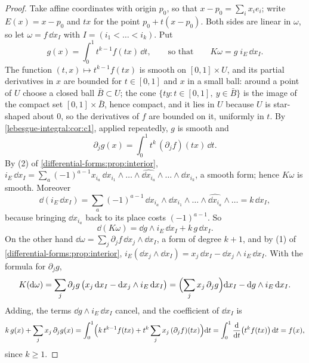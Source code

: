 \begin{notechapter}
\begin{proof}
Take affine coordinates with origin $p_0$, so that
$x - p_0 = \sum_ix_ie_i$; write $E(x) = x - p_0$ and $tx$ for the point
$p_0 + t(x - p_0)$. Both sides are linear in $\omega$, so let
$\omega = f\,\dd x_I$ with $I = (i_1 < \dots < i_k)$. Put
\[
  g(x) = \int_0^1t^{k-1}f(tx)\,\dd t ,
  \qquad\text{so that}\qquad
  K\omega = g\;i_E\,\dd x_I .
\]
The function $(t, x)\mapsto t^{k-1}f(tx)$ is smooth on $[0, 1]\times U$,
and its partial derivatives in $x$ are bounded for $t\in[0, 1]$ and $x$
in a small ball: around a point of $U$ choose a closed ball
$\bar B\subset U$; the cone $\{ty : t\in[0, 1],\ y\in\bar B\}$ is the
image of the compact set $[0, 1]\times\bar B$, hence compact, and it
lies in $U$ because $U$ is star-shaped about $0$, so the derivatives
of $f$ are bounded on it, uniformly in $t$.
By \cref{lebesgue-integral:cor:c1}, applied
repeatedly, $g$ is smooth and
\[
  \partial_jg(x) = \int_0^1t^k\,(\partial_jf)(tx)\,\dd t .
\]
By (2) of \cref{differential-forms:prop:interior},
$i_E\,\dd x_I = \sum_a(-1)^{a-1}x_{i_a}\,
\dd x_{i_1}\wedge\dots\wedge\widehat{\dd x_{i_a}}\wedge\dots\wedge
\dd x_{i_k}$, a smooth form; hence $K\omega$ is smooth. Moreover
\[
  \dd(i_E\,\dd x_I)
  = \sum_a(-1)^{a-1}\,\dd x_{i_a}\wedge
    \dd x_{i_1}\wedge\dots\wedge\widehat{\dd x_{i_a}}\wedge\dots
  = k\,\dd x_I ,
\]
because bringing $\dd x_{i_a}$ back to its place costs $(-1)^{a-1}$.
So
\[
  \dd(K\omega) = \dd g\wedge i_E\,\dd x_I + k\,g\,\dd x_I .
\]
On the other hand $\dd\omega = \sum_j\partial_jf\,\dd x_j\wedge\dd x_I$,
a form of degree $k + 1$, and by (1) of
\cref{differential-forms:prop:interior},
$i_E(\dd x_j\wedge\dd x_I) = x_j\,\dd x_I - \dd x_j\wedge i_E\,\dd x_I$.
With the formula for $\partial_jg$,
\[
  K(\mathrm{d}\omega)
  = \sum_j\partial_jg\,\bigl(x_j\,\mathrm{d} x_I
    - \mathrm{d} x_j\wedge i_E\,\mathrm{d} x_I\bigr)
  = \Bigl(\sum_jx_j\,\partial_jg\Bigr)\mathrm{d} x_I
    - \mathrm{d} g\wedge i_E\,\mathrm{d} x_I .
\]
Adding, the terms $\dd g\wedge i_E\,\dd x_I$ cancel, and the
coefficient of $\dd x_I$ is
\[
  k\,g(x) + \sum_jx_j\,\partial_jg(x)
  = \int_0^1\Bigl(k\,t^{k-1}f(tx)
    + t^k\sum_jx_j\,(\partial_jf)(tx)\Bigr)\mathrm{d} t
  = \int_0^1\frac{\mathrm{d}}{\mathrm{d} t}\bigl(t^kf(tx)\bigr)\,\mathrm{d} t = f(x) ,
\]
since $k\geq1$.
\end{proof}


\end{notechapter}
